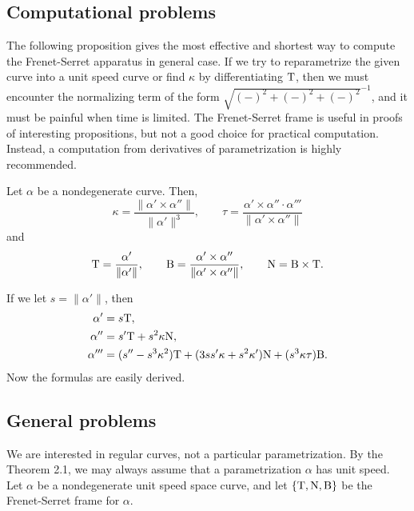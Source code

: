 \documentclass{../../large}
\def\a{\alpha}
\begin{document}
\subsection{Computational problems}

The following proposition gives the most effective and shortest way to compute the Frenet-Serret apparatus in general case.
If we try to reparametrize the given curve into a unit speed curve or find $\kappa$ by differentiating $\mathrm{T}$, then we must encounter the normalizing term of the form $\sqrt{(-)^2+(-)^2+(-)^2}^{-1}$, and it must be painful when time is limited.
The Frenet-Serret frame is useful in proofs of interesting propositions, but not a good choice for practical computation.
Instead, a computation from derivatives of parametrization is highly recommended.
\begin{prop}
Let $\a$ be a nondegenerate curve.
Then,
\[\kappa=\frac{\|\a'\times\a''\|}{\|\a'\|^3},\qquad\tau=\frac{\a'\times\a''\cdot\a'''}{\|\a'\times\a''\|}\]
and
\[\rT=\frac{\a'}{\|\a'\|},\qquad\rB=\frac{\a'\times\a''}{\|\a'\times\a''\|},\qquad\rN=\rB\times\rT.\]
\end{prop}
\begin{pf}
If we let $s=\|\a'\|$, then
\begin{align*}
\a'&=s\rT,\\
\a''&=s'\rT+s^2\kappa\rN,\\
\a'''&=(s''-s^3\kappa^2)\rT+(3ss'\kappa+s^2\kappa')\rN+(s^3\kappa\tau)\rB.
\end{align*}
Now the formulas are easily derived.
\end{pf}



\subsection{General problems}

We are interested in regular curves, not a particular parametrization.
By the Theorem 2.1, we may always assume that a parametrization $\a$ has unit speed.
Let $\a$ be a nondegenerate unit speed space curve, and let $\{\mathrm{T},\mathrm{N},\mathrm{B}\}$ be the Frenet-Serret frame for $\a$.
\end{document}
